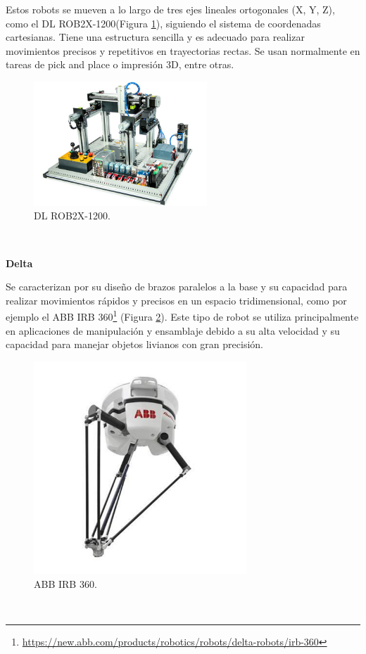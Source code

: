 Estos robots se mueven a lo largo de tres ejes lineales ortogonales (X, Y, Z), como el DL ROB2X-1200(Figura \ref{fig:cartesiano}), siguiendo el sistema de coordenadas cartesianas. Tiene una estructura sencilla y es adecuado para realizar movimientos precisos y repetitivos en trayectorias rectas. Se usan normalmente en tareas de pick and place o impresión 3D, entre otras.
 


\begin{figure} [h!]
  \begin{center}
    \includegraphics[width=6.5cm]{figs/cartesiano}
  \end{center}
  \caption{DL ROB2X-1200.}
  \label{fig:cartesiano}
\end{figure}\

\noindent\textbf{Delta} 




Se caracterizan por su diseño de brazos paralelos a la base y su capacidad para realizar movimientos rápidos y precisos en un espacio tridimensional, como por ejemplo el ABB IRB 360\footnote{\url{https://new.abb.com/products/robotics/robots/delta-robots/irb-360}} (Figura \ref{fig:delta}). Este tipo de robot se utiliza principalmente en aplicaciones de manipulación y ensamblaje debido a su alta velocidad y su capacidad para manejar objetos livianos con gran precisión. 

\begin{figure} [h!]
  \begin{center}
    \includegraphics[width=8cm]{figs/delta}
  \end{center}
  \caption{ABB IRB 360.}
  \label{fig:delta}
\end{figure}\


